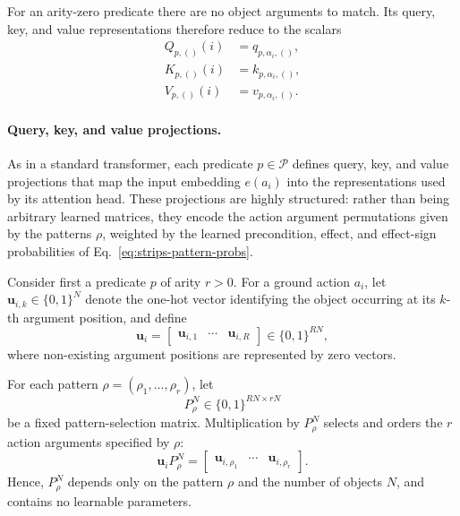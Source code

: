For an arity-zero predicate there are no object arguments to match.
Its query, key, and value representations therefore reduce to the scalars
\begin{equation}
\begin{aligned}
Q_{p,()}(i) &= q_{p,\alpha_i,()},\\
K_{p,()}(i) &= k_{p,\alpha_i,()},\\
V_{p,()}(i) &= v_{p,\alpha_i,()}.
\end{aligned}
\label{eq:strips-nullary-qkv}
\end{equation}
\fi




\paragraph{Query, key, and value projections.}
As in a standard transformer, each predicate $p\in\mathcal{P}$ defines
query, key, and value projections that map the input embedding $e(a_i)$
into the representations used by its attention head.
These projections are highly structured: rather than being arbitrary learned
matrices, they encode the action argument permutations given by the patterns $\rho$,
weighted by the learned precondition, effect, and effect-sign
probabilities of Eq.~\ref{eq:strips-pattern-probs}.

Consider first a predicate $p$ of arity $r>0$.
For a ground action $a_i$, let
$\mathbf{u}_{i,k}\in\{0,1\}^{N}$ denote the one-hot vector identifying the
object occurring at its $k$-th argument position, and define
\begin{equation}
\mathbf{u}_i
=
\begin{bmatrix}
\mathbf{u}_{i,1} &
\cdots &
\mathbf{u}_{i,R}
\end{bmatrix}
\in\{0,1\}^{RN},
\label{eq:strips-object-vector}
\end{equation}
where non-existing argument positions are represented by zero vectors.

For each pattern
$\rho=(\rho_1,\ldots,\rho_r)$, let
\begin{equation}
P_{\rho}^{N}\in\{0,1\}^{RN\times rN}
\end{equation}
be a fixed pattern-selection matrix.
Multiplication by $P_{\rho}^{N}$ selects and orders the $r$ action arguments
specified by $\rho$:
\begin{equation}
\mathbf{u}_i P_{\rho}^{N}
=
\begin{bmatrix}
\mathbf{u}_{i,\rho_1} &
\cdots &
\mathbf{u}_{i,\rho_r}
\end{bmatrix}.
\label{eq:strips-pattern-selection}
\end{equation}
Hence, $P_{\rho}^{N}$ depends only on the pattern $\rho$ and the number of
objects $N$, and contains no learnable parameters.

